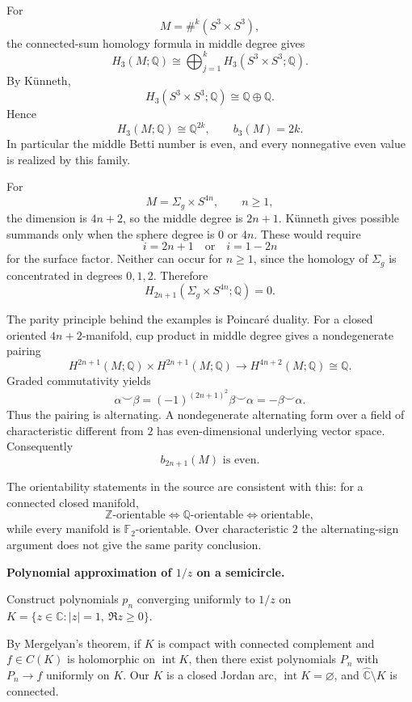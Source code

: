 \begin{solution}
For
\[
M=\#^k(S^3\times S^3),
\]
the connected-sum homology formula in middle degree gives
\[
H_3(M;\mathbb Q)
\cong
\bigoplus_{j=1}^k
H_3(S^3\times S^3;\mathbb Q).
\]
By K\"unneth,
\[
H_3(S^3\times S^3;\mathbb Q)
\cong
\mathbb Q\oplus\mathbb Q.
\]
Hence
\[
\boxed{
H_3(M;\mathbb Q)\cong\mathbb Q^{2k},
\qquad
b_3(M)=2k.
}
\]
In particular the middle Betti number is even, and every nonnegative even value is realized
by this family.

For
\[
M=\Sigma_g\times S^{4n},
\qquad n\ge1,
\]
the dimension is \(4n+2\), so the middle degree is \(2n+1\). K\"unneth gives possible
summands only when the sphere degree is \(0\) or \(4n\). These would require
\[
i=2n+1
\quad\text{or}\quad
i=1-2n
\]
for the surface factor. Neither can occur for \(n\ge1\), since the homology of
\(\Sigma_g\) is concentrated in degrees \(0,1,2\). Therefore
\[
\boxed{
H_{2n+1}(\Sigma_g\times S^{4n};\mathbb Q)=0.
}
\]

The parity principle behind the examples is Poincar\'e duality. For a closed oriented
\(4n+2\)-manifold, cup product in middle degree gives a nondegenerate pairing
\[
H^{2n+1}(M;\mathbb Q)\times H^{2n+1}(M;\mathbb Q)
\longrightarrow
H^{4n+2}(M;\mathbb Q)\cong\mathbb Q.
\]
Graded commutativity yields
\[
\alpha\smile\beta
=
(-1)^{(2n+1)^2}\beta\smile\alpha
=
-\beta\smile\alpha.
\]
Thus the pairing is alternating. A nondegenerate alternating form over a field of
characteristic different from \(2\) has even-dimensional underlying vector space.
Consequently
\[
\boxed{b_{2n+1}(M)\text{ is even}.}
\]

The orientability statements in the source are consistent with this: for a connected closed
manifold,
\[
\mathbb Z\text{-orientable}
\iff
\mathbb Q\text{-orientable}
\iff
\text{orientable},
\]
while every manifold is \(\mathbb F_2\)-orientable. Over characteristic \(2\) the
alternating-sign argument does not give the same parity conclusion.
\end{solution}


\begin{problem}[CP-II-0407]
\label{prob:cp-ii-0407}
\textbf{Polynomial approximation of $1/z$ on a semicircle.}

\hspace*{1.5em}Construct polynomials $p_n$ converging uniformly to $1/z$ on
$K=\{z\in\mathbb C: |z|=1,\ \Re z\ge 0\}$.

By Mergelyan's theorem, if $K$ is compact with connected complement and
$f\in C(K)$ is holomorphic on $\operatorname{int}K$, then there exist polynomials
$P_n$ with $P_n\to f$ uniformly on $K$.
Our $K$ is a closed Jordan arc, $\operatorname{int}K=\varnothing$, and
$\widehat{\mathbb C}\setminus K$ is connected.
\end{problem}

